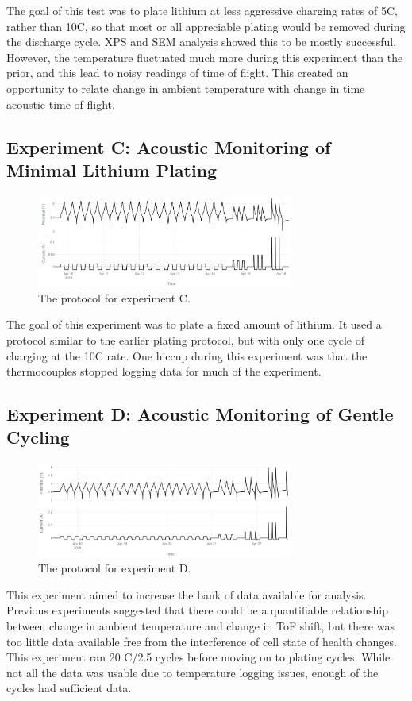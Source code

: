 The goal of this test was to plate lithium at less aggressive charging rates of 5C, rather than 10C, so that most or all appreciable plating would be removed during the discharge cycle. XPS and SEM analysis showed this to be mostly successful. However, the temperature fluctuated much more during this experiment than the prior, and this lead to noisy readings of time of flight. This created an opportunity to relate change in ambient temperature with change in time acoustic time of flight. 

\subsection{Experiment C: Acoustic Monitoring of Minimal Lithium Plating}
\begin{figure}[h!]\label{fig:neware0409}
    \includegraphics[width=0.75\textwidth]{Thesis/neware0409.PNG}
    \centering
    \caption{The protocol for experiment C.}
\end{figure}
The goal of this experiment was to plate a fixed amount of lithium. It used a protocol similar to the earlier plating protocol, but with only one cycle of charging at the 10C rate. One hiccup during this experiment was that the thermocouples stopped logging data for much of the experiment. 


\subsection{Experiment D: Acoustic Monitoring of Gentle Cycling}
\begin{figure}[h!]\label{fig:neware0417}
    \includegraphics[width=0.75\textwidth]{Thesis/neware0417.PNG}
    \centering
    \caption{The protocol for experiment D.}
\end{figure}
This experiment aimed to increase the bank of data available for analysis. Previous experiments suggested that there could be a quantifiable relationship between change in ambient temperature and change in ToF shift, but there was too little data available free from the interference of cell state of health changes. This experiment ran 20 C/2.5 cycles before moving on to plating cycles. While not all the data was usable due to temperature logging issues, enough of the cycles had sufficient data.